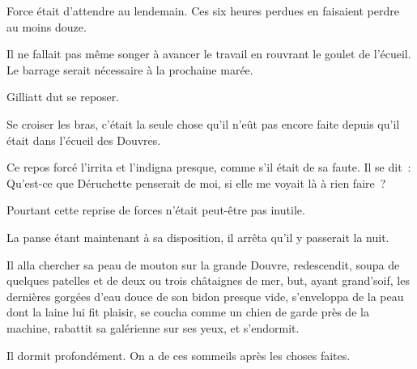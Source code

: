 \documentclass[french,twoside]{book} %
\begin{document}
Force était d’attendre au lendemain. Ces six heures perdues en faisaient perdre au moins douze.\par
Il ne fallait pas même songer à avancer le travail en rouvrant le goulet de l’écueil. Le barrage serait nécessaire à la prochaine marée.\par
Gilliatt dut se reposer.\par
Se croiser les bras, c’était la seule chose qu’il n’eût pas encore faite depuis qu’il était dans l’écueil des Douvres.\par
 Ce repos forcé l’irrita et l’indigna presque, comme s’il était de sa faute. Il se dit : Qu’est-ce que Déruchette penserait de moi, si elle me voyait là à rien faire ?\par
Pourtant cette reprise de forces n’était peut-être pas inutile.\par
La panse étant maintenant à sa disposition, il arrêta qu’il y passerait la nuit.\par
Il alla chercher sa peau de mouton sur la grande Douvre, redescendit, soupa de quelques patelles et de deux ou trois châtaignes de mer, but, ayant grand’soif, les dernières gorgées d’eau douce de son bidon presque vide, s’enveloppa de la peau dont la laine lui fit plaisir, se coucha comme un chien de garde près de la machine, rabattit sa galérienne sur ses yeux, et s’endormit.\par
Il dormit profondément. On a de ces sommeils après les choses faites.
\end{document}
